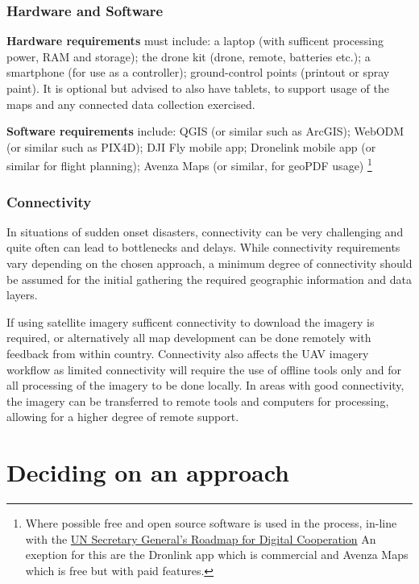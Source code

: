 \documentclass[
  a4paper,
  onecolumn,
  oneside]{book}
\begin{document}
\hypertarget{hardware-and-software}{%
\subsection{Hardware and Software}\label{hardware-and-software}}

\textbf{Hardware requirements} must include: a laptop (with sufficent
processing power, RAM and storage); the drone kit (drone, remote,
batteries etc.); a smartphone (for use as a controller); ground-control
points (printout or spray paint). It is optional but advised to also
have tablets, to support usage of the maps and any connected data
collection exercised.

\textbf{Software requirements} include: QGIS (or similar such as
ArcGIS); WebODM (or similar such as PIX4D); DJI Fly mobile app;
Dronelink mobile app (or similar for flight planning); Avenza Maps (or
similar, for geoPDF usage) \footnote{Where possible free and open source
  software is used in the process, in-line with the
  \href{https://www.un.org/en/content/digital-cooperation-roadmap/}{UN
  Secretary General's Roadmap for Digital Cooperation} An exeption for
  this are the Dronlink app which is commercial and Avenza Maps which is
  free but with paid features.}

\hypertarget{connectivity}{%
\subsection{Connectivity}\label{connectivity}}

In situations of sudden onset disasters, connectivity can be very
challenging and quite often can lead to bottlenecks and delays. While
connectivity requirements vary depending on the chosen approach, a
minimum degree of connectivity should be assumed for the initial
gathering the required geographic information and data layers.

If using satellite imagery sufficent connectivity to download the
imagery is required, or alternatively all map development can be done
remotely with feedback from within country. Connectivity also affects
the UAV imagery workflow as limited connectivity will require the use of
offline tools only and for all processing of the imagery to be done
locally. In areas with good connectivity, the imagery can be transferred
to remote tools and computers for processing, allowing for a higher
degree of remote support.

\hypertarget{deciding-on-an-approach}{%
\chapter{Deciding on an approach}\label{deciding-on-an-approach}}
\end{document}
